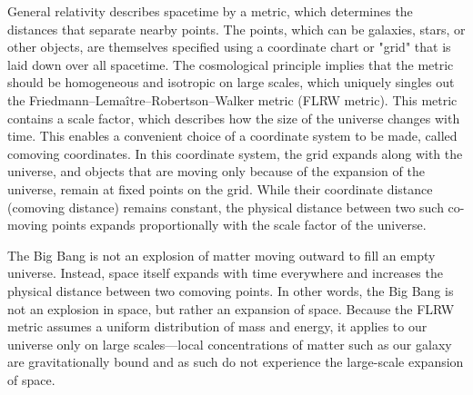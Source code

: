 \documentclass[14pt, oneside]{book}
\begin{document}
				General relativity describes spacetime by a metric, which determines the distances that separate nearby points. The points, which can be galaxies, stars, or other objects, are themselves specified using a coordinate chart or "grid" that is laid down over all spacetime. The cosmological principle implies that the metric should be homogeneous and isotropic on large scales, which uniquely singles out the Friedmann–Lemaître–Robertson–Walker metric (FLRW metric). This metric contains a scale factor, which describes how the size of the universe changes with time. This enables a convenient choice of a coordinate system to be made, called comoving coordinates. In this coordinate system, the grid expands along with the universe, and objects that are moving only because of the expansion of the universe, remain at fixed points on the grid. While their coordinate distance (comoving distance) remains constant, the physical distance between two such co-moving points expands proportionally with the scale factor of the universe.
	
				The Big Bang is not an explosion of matter moving outward to fill an empty universe. Instead, space itself expands with time everywhere and increases the physical distance between two comoving points. In other words, the Big Bang is not an explosion in space, but rather an expansion of space. Because the FLRW metric assumes a uniform distribution of mass and energy, it applies to our universe only on large scales—local concentrations of matter such as our galaxy are gravitationally bound and as such do not experience the large-scale expansion of space.
	
\end{document}
